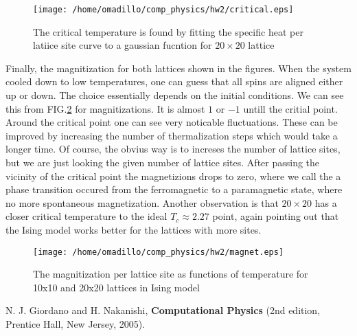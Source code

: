 \documentclass[a4paper,prb,8pt]{revtex4-1}
\begin{document}
\begin{figure}
\begin{center}
\texttt{[image: /home/omadillo/comp\_physics/hw2/critical.eps]}
\caption{The critical temperature is found by fitting the specific heat per latiice site curve to a gaussian fucntion for $20\times20$ lattice}
\label{fig5}
\end{center}
\end{figure}

Finally, the magnitization for both lattices shown in the figures. When the system cooled down to low temperatures, one can guess that all spins are aligned either up or down. The choice essentially depends on the initial conditions. We can see this from FIG.\ref{fig6} for magnitizations. It is almost $1$ or $-1$ untill the critial point. Around the critical point one can see very noticable fluctuations. These can be improved by increasing the number of thermalization steps which would take a longer time. Of course, the obvius way is to increses the number of lattice sites, but we are just looking the given number of lattice sites. After passing the vicinity of the critical point the magnetizions drops to zero, where we call the a phase transition occured from the ferromagnetic to a paramagnetic state, where no more spontaneous magnetization. Another observation is that $20\times20$ has a closer critical temperature to the ideal $T_c\approx 2.27$ point, again pointing out that the Ising model works better for the lattices with more sites.
\begin{figure}[H]
\begin{center}
\texttt{[image: /home/omadillo/comp\_physics/hw2/magnet.eps]}
\caption{The magnitization per lattice site as functions of temperature for 10x10 and 20x20 lattices in Ising model}
\label{fig6}
\end{center}
\end{figure}

\begin{thebibliography}{1}
	 N. J. Giordano and H. Nakanishi, \textbf{Computational Physics} (2nd edition, Prentice Hall, New Jersey, 2005).
\end{thebibliography}



%


%
\end{document}
